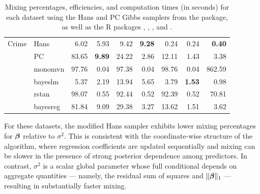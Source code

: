 \begin{table}[!ht]
\begin{tabular}{c|l|rr|rr|rr|r}
\midrule 
Crime    & Hans           &  6.02     &  5.93       & 9.42     & \textbf{9.28}   &   0.24   & 0.24  &  \textbf{0.40} \\
         & PC             & 83.65    &  \textbf{9.89}       & 24.22      & 2.86    &  12.11    & 1.43  &   3.38 \\
         & monomvn        & 97.76  &    0.04        & 97.38      &    0.04      &  98.76    &  0.04  & 862.59 \\
         & bayeslm        &  5.37    &   2.19      &  13.94     &  5.65     &  3.79     &  \textbf{1.53} &  0.98 \\
         & rstan           & 98.07     & 0.55       & 92.44      &    0.52        &  92.39      &  0.52  & 70.81  \\ 
         & bayesreg       & 81.84       &  9.09      & 29.38      &  3.27       &  13.62    &  1.51 &  3.62 \\      
         \bottomrule
    
    \end{tabular}
    \caption{Mixing percentages, efficiencies, and computation times (in seconds) for each dataset using the Hans and PC Gibbs samplers from the  package, as well as the R packages , , , and .}
    \label{tab:ngtp_results_lasso}
\end{table}

For these datasets, the modified Hans sampler exhibits lower mixing percentages 
for ${\boldsymbol \beta}$ relative to $\sigma^2$. This is consistent with the coordinate-wise 
structure of the algorithm, where regression coefficients are updated sequentially 
and mixing can be slower in the presence of strong posterior dependence among 
predictors. In contrast, $\sigma^2$ is a scalar global parameter whose full 
conditional depends on aggregate quantities --- namely, the residual sum of squares 
and $\|{\boldsymbol \beta}\|_1$ --- resulting in substantially faster mixing.



